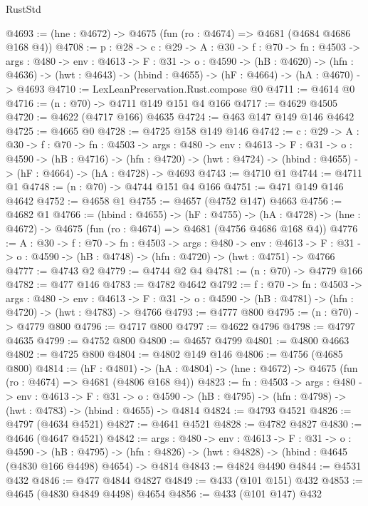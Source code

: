 \begin{lexlean}{RustStd}
\begin{coremodule}
@4693 := (hne : @4672) -> @4675 (fun (ro : @4674) => @4681 (@4684 @4686 @168 @4))
@4708 := {p : @28} ->
  {c : @29} ->
  {A : @30} ->
  {f : @70} ->
  {fn : @4503} ->
  {args : @480} ->
  {env : @4613} ->
  {F : @31} ->
  {o : @4590} ->
  (hB : @4620) ->
  (hfn : @4636) -> (hwt : @4643) -> (hbind : @4655) -> (hF : @4664) -> (hA : @4670) -> @4693
@4710 := LexLeanPreservation.Rust.compose @0
@4711 := @4614 @0
@4716 := (n : @70) -> @4711 @149 @151 @4 @166
@4717 := @4629 @4505
@4720 := @4622 (@4717 @166) @4635
@4724 := @463 @147 @149 @146 @4642
@4725 := @4665 @0
@4728 := @4725 @158 @149 @146
@4742 := {c : @29} ->
  {A : @30} ->
  {f : @70} ->
  {fn : @4503} ->
  {args : @480} ->
  {env : @4613} ->
  {F : @31} ->
  {o : @4590} ->
  (hB : @4716) ->
  (hfn : @4720) -> (hwt : @4724) -> (hbind : @4655) -> (hF : @4664) -> (hA : @4728) -> @4693
@4743 := @4710 @1
@4744 := @4711 @1
@4748 := (n : @70) -> @4744 @151 @4 @166
@4751 := @471 @149 @146 @4642
@4752 := @4658 @1
@4755 := @4657 (@4752 @147) @4663
@4756 := @4682 @1
@4766 := (hbind : @4655) ->
  (hF : @4755) ->
  (hA : @4728) -> (hne : @4672) -> @4675 (fun (ro : @4674) => @4681 (@4756 @4686 @168 @4))
@4776 := {A : @30} ->
  {f : @70} ->
  {fn : @4503} ->
  {args : @480} ->
  {env : @4613} ->
  {F : @31} -> {o : @4590} -> (hB : @4748) -> (hfn : @4720) -> (hwt : @4751) -> @4766
@4777 := @4743 @2
@4779 := @4744 @2 @4
@4781 := (n : @70) -> @4779 @166
@4782 := @477 @146
@4783 := @4782 @4642
@4792 := {f : @70} ->
  {fn : @4503} ->
  {args : @480} ->
  {env : @4613} ->
  {F : @31} -> {o : @4590} -> (hB : @4781) -> (hfn : @4720) -> (hwt : @4783) -> @4766
@4793 := @4777 @800
@4795 := (n : @70) -> @4779 @800
@4796 := @4717 @800
@4797 := @4622 @4796
@4798 := @4797 @4635
@4799 := @4752 @800
@4800 := @4657 @4799
@4801 := @4800 @4663
@4802 := @4725 @800
@4804 := @4802 @149 @146
@4806 := @4756 (@4685 @800)
@4814 := (hF : @4801) ->
  (hA : @4804) -> (hne : @4672) -> @4675 (fun (ro : @4674) => @4681 (@4806 @168 @4))
@4823 := {fn : @4503} ->
  {args : @480} ->
  {env : @4613} ->
  {F : @31} ->
  {o : @4590} -> (hB : @4795) -> (hfn : @4798) -> (hwt : @4783) -> (hbind : @4655) -> @4814
@4824 := @4793 @4521
@4826 := @4797 (@4634 @4521)
@4827 := @4641 @4521
@4828 := @4782 @4827
@4830 := @4646 (@4647 @4521)
@4842 := {args : @480} ->
  {env : @4613} ->
  {F : @31} ->
  {o : @4590} ->
  (hB : @4795) ->
  (hfn : @4826) -> (hwt : @4828) -> (hbind : @4645 (@4830 @166 @4498) @4654) -> @4814
@4843 := @4824 @4490
@4844 := @4531 @432
@4846 := @477 @4844 @4827
@4849 := @433 (@101 @151) @432
@4853 := @4645 (@4830 @4849 @4498) @4654
@4856 := @433 (@101 @147) @432

\end{coremodule}
\end{lexlean}
